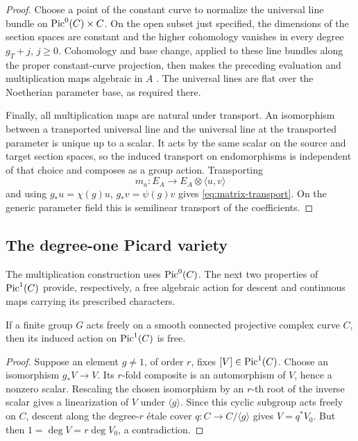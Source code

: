 \begin{proof}
Choose a point of the constant curve to normalize the
universal line bundle on \(\operatorname{Pic}^0(C)\times C\).
On the open subset just specified, the dimensions of the
section spaces are constant and the higher cohomology
vanishes in every degree \(g_T+j\), \(j\ge0\).
Cohomology and base change, applied to these line bundles along the
proper constant-curve projection, then makes the preceding evaluation
and multiplication maps algebraic in \(A\)
\cite[Lemma~30.22.1, Tag 07VK]{Stacks}. The universal lines are flat
over the Noetherian parameter base, as required there.

Finally, all multiplication maps are natural under transport.
An isomorphism between a transported universal line and
the universal line at the transported parameter is unique
up to a scalar.  It acts by the same scalar on the source
and target section spaces, so the induced transport on
endomorphisms is independent of that choice and composes
as a group action.  Transporting
\[
 m_a:E_A\longrightarrow E_A\otimes\langle u,v\rangle
\]
and using \(g_*u=\chi(g)u\), \(g_*v=\psi(g)v\) gives
\eqref{eq:matrix-transport}.  On the generic parameter
field this is semilinear transport of the coefficients.
\end{proof}

\subsection{The degree-one Picard variety}

The multiplication construction uses \(\operatorname{Pic}^0(C)\).
The next two properties of \(\operatorname{Pic}^1(C)\) provide, respectively,
a free algebraic action for descent and continuous maps
carrying its prescribed characters.

\begin{lemma}\label{lem:picard-free}
If a finite group \(G\) acts freely on a smooth connected
projective complex curve \(C\), then its induced action on
\(\operatorname{Pic}^1(C)\) is free.
\end{lemma}

\begin{proof}
Suppose an element \(g\ne1\), of order \(r\), fixes
\([V]\in\operatorname{Pic}^1(C)\).  Choose an isomorphism \(g_*V\to V\).
Its \(r\)-fold composite is an automorphism of \(V\), hence
a nonzero scalar.  Rescaling the chosen isomorphism by
an \(r\)-th root of the inverse scalar gives a linearization
of \(V\) under \(\langle g\rangle\).
Since this cyclic subgroup acts freely on \(C\), descent
along the degree-\(r\) \'etale cover
\(q:C\to C/\langle g\rangle\) gives \(V=q^*V_0\).
But then \(1=\deg V=r\deg V_0\), a contradiction.
\end{proof}

